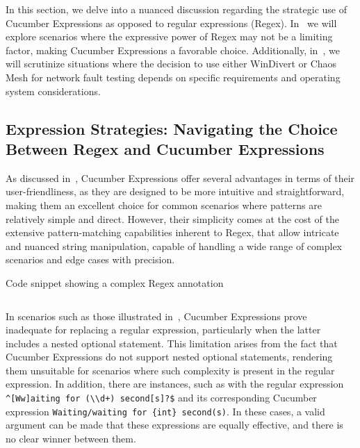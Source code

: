 In this section, we delve into a nuanced discussion regarding the strategic use of Cucumber Expressions as opposed to regular expressions (\ac{Regex}). In~ we will explore scenarios where the expressive power of \ac{Regex} may not be a limiting factor, making Cucumber Expressions a favorable choice. Additionally, in~, we will scrutinize situations where the decision to use either WinDivert or Chaos Mesh for network fault testing depends on specific requirements and operating system considerations.

\subsection{Expression Strategies: Navigating the Choice Between \ac{Regex} and Cucumber Expressions}
\label{subsec:expression-strategies}

As discussed in~, Cucumber Expressions offer several advantages in terms of their user-friendliness, as they are designed to be more intuitive and straightforward, making them an excellent choice for common scenarios where patterns are relatively simple and direct. However, their simplicity comes at the cost of the extensive pattern-matching capabilities inherent to \ac{Regex}, that allow intricate and nuanced string manipulation, capable of handling a wide range of complex scenarios and edge cases with precision. 

\begin{listing}[!ht]
\caption{Code snippet showing a complex \ac{Regex} annotation}
\label{lst:complexRegex}
\inputminted[linenos, xleftmargin=2em]{java}{files/code/complexRegex.java}
\end{listing}

In scenarios such as those illustrated in~, Cucumber Expressions prove inadequate for replacing a regular expression, particularly when the latter includes a nested optional statement. This limitation arises from the fact that Cucumber Expressions do not support nested optional statements, rendering them unsuitable for scenarios where such complexity is present in the regular expression. In addition, there are instances, such as with the regular expression \verb|^[Ww]aiting for (\\d+) second[s]?$| and its corresponding Cucumber expression \verb|Waiting/waiting for {int} second(s)|. In these cases, a valid argument can be made that these expressions are equally effective, and there is no clear winner between them.


